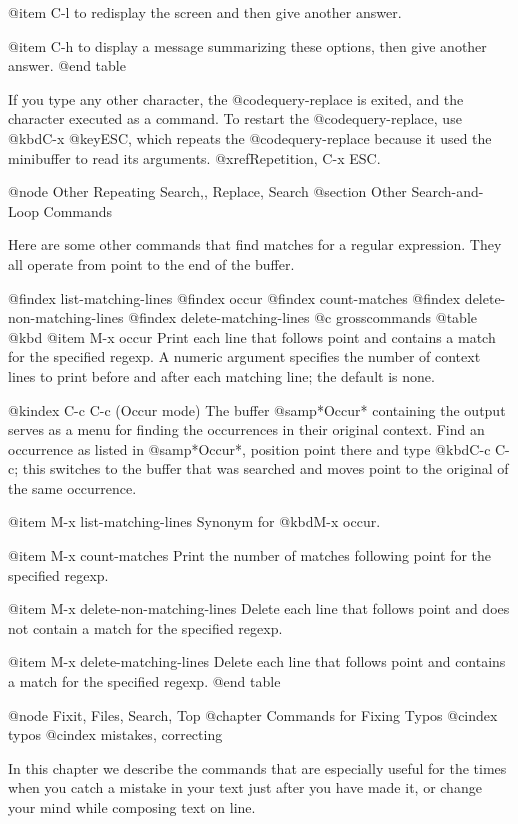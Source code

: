 {{{{{{{{{{{{{{{{{{{{@item C-l
to redisplay the screen and then give another answer.

@item C-h
to display a message summarizing these options, then give another
answer.
@end table

  If you type any other character, the @code{query-replace} is exited, and
the character executed as a command.  To restart the @code{query-replace},
use @kbd{C-x @key{ESC}}, which repeats the @code{query-replace} because it
used the minibuffer to read its arguments.  @xref{Repetition, C-x ESC}.
  
@node Other Repeating Search,, Replace, Search
@section Other Search-and-Loop Commands

  Here are some other commands that find matches for a regular expression.
They all operate from point to the end of the buffer.

@findex list-matching-lines
@findex occur
@findex count-matches
@findex delete-non-matching-lines
@findex delete-matching-lines
@c grosscommands
@table @kbd
@item M-x occur
Print each line that follows point and contains a match for the
specified regexp.  A numeric argument specifies the number of context
lines to print before and after each matching line; the default is
none.

@kindex C-c C-c (Occur mode)
The buffer @samp{*Occur*} containing the output serves as a menu for
finding the occurrences in their original context.  Find an occurrence
as listed in @samp{*Occur*}, position point there and type @kbd{C-c
C-c}; this switches to the buffer that was searched and moves point to
the original of the same occurrence.

@item M-x list-matching-lines
Synonym for @kbd{M-x occur}.

@item M-x count-matches
Print the number of matches following point for the specified regexp.

@item M-x delete-non-matching-lines
Delete each line that follows point and does not contain a match for
the specified regexp.

@item M-x delete-matching-lines
Delete each line that follows point and contains a match for the
specified regexp.
@end table

@node Fixit, Files, Search, Top
@chapter Commands for Fixing Typos
@cindex typos
@cindex mistakes, correcting

  In this chapter we describe the commands that are especially useful for
the times when you catch a mistake in your text just after you have made
it, or change your mind while composing text on line.

}}}}}}}}}}}}}}}}}}}}
